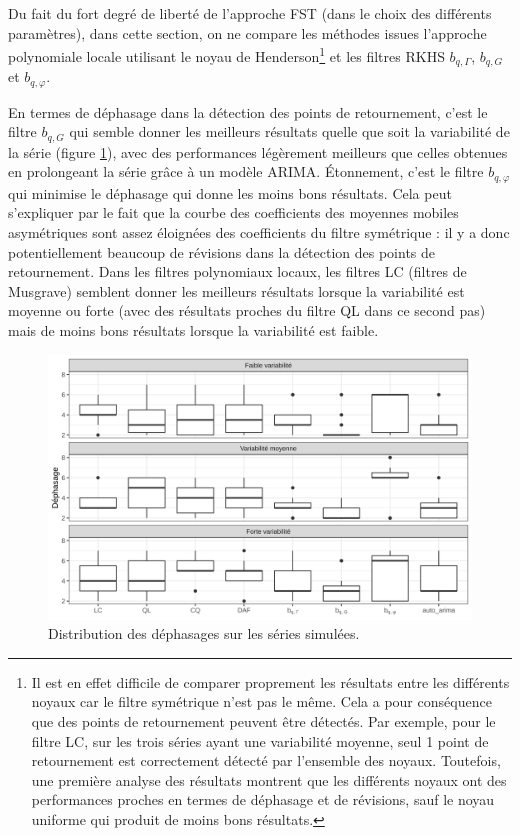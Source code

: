\documentclass[
  12pt,
  french,
  12pt,a4paper]{article}
\newcommand\1{\mathds{1}}
\begin{document}
Du fait du fort degré de liberté de l'approche FST (dans le choix des différents paramètres), dans cette section, on ne compare les méthodes issues l'approche polynomiale locale utilisant le noyau de Henderson\footnote{
  Il est en effet difficile de comparer proprement les résultats entre les différents noyaux car le filtre symétrique n'est pas le même. Cela a pour conséquence que des points de retournement peuvent être détectés. Par exemple, pour le filtre LC, sur les trois séries ayant une variabilité moyenne, seul 1 point de retournement est correctement détecté par l'ensemble des noyaux.
  Toutefois, une première analyse des résultats montrent que les différents noyaux ont des performances proches en termes de déphasage et de révisions, sauf le noyau uniforme qui produit de moins bons résultats.} et les filtres RKHS \(b_{q,\Gamma}\), \(b_{q,G}\) et \(b_{q,\varphi}\).

En termes de déphasage dans la détection des points de retournement, c'est le filtre \(b_{q,G}\) qui semble donner les meilleurs résultats quelle que soit la variabilité de la série (figure \ref{fig:graphstpsimul}), avec des performances légèrement meilleurs que celles obtenues en prolongeant la série grâce à un modèle ARIMA.
Étonnement, c'est le filtre \(b_{q,\varphi}\) qui minimise le déphasage qui donne les moins bons résultats. Cela peut s'expliquer par le fait que la courbe des coefficients des moyennes mobiles asymétriques sont assez éloignées des coefficients du filtre symétrique : il y a donc potentiellement beaucoup de révisions dans la détection des points de retournement.
Dans les filtres polynomiaux locaux, les filtres LC (filtres de Musgrave) semblent donner les meilleurs résultats lorsque la variabilité est moyenne ou forte (avec des résultats proches du filtre QL dans ce second pas) mais de moins bons résultats lorsque la variabilité est faible.

\begin{figure}

{\centering \includegraphics[width=1\linewidth]{img/simulations/phase_shift_simul} 

}

\caption[Distribution des déphasages sur les séries simulées]{Distribution des déphasages sur les séries simulées.}\label{fig:graphstpsimul}

\footnotesize
\normalsize\end{figure}
\end{document}
